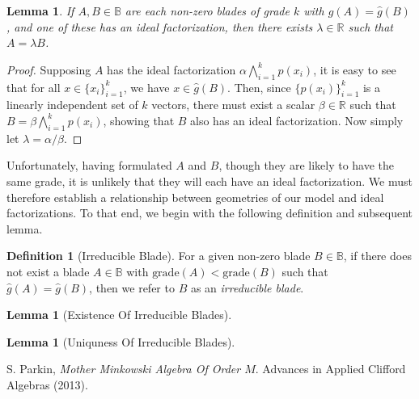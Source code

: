 \documentclass{birkjour}
\newtheorem{lem}[thm]{Lemma}
\theoremstyle{definition}
\newtheorem{defn}[thm]{Definition}
\theoremstyle{remark}
\numberwithin{equation}{section}
\newcommand{\R}{\mathbb{R}}
\newcommand{\B}{\mathbb{B}}
\newcommand{\gh}{\hat{g}}
\newcommand{\grade}{\mbox{grade}}
\begin{document}
\begin{lem}
If $A,B\in\B$ are each non-zero blades of grade $k$ with $\gh(A)=\gh(B)$, and one of these
has an ideal factorization, then there exists $\lambda\in\R$ such that $A=\lambda B$.
\end{lem}
\begin{proof}
Supposing $A$ has the ideal factorization $\alpha\bigwedge_{i=1}^k p(x_i)$,
it is easy to see that for all $x\in\{x_i\}_{i=1}^k$, we have $x\in\gh(B)$.
Then, since $\{p(x_i)\}_{i=1}^k$ is a linearly independent set of $k$ vectors,
there must exist a scalar $\beta\in\R$ such that $B=\beta\bigwedge_{i=1}^k p(x_i)$,
showing that $B$ also has an ideal factorization.  Now simply let $\lambda=\alpha/\beta$.
\end{proof}

Unfortunately, having formulated $A$ and $B$, though they are likely to have the same grade,
it is unlikely that they will each have an ideal factorization.  We must therefore establish a relationship
between geometries of our model and ideal factorizations.  To that end, we begin with the following
definition and subsequent lemma.

\begin{defn}[Irreducible Blade]
For a given non-zero blade $B\in\B$, if there does not exist a blade $A\in\B$
with $\grade(A)<\grade(B)$ such that $\gh(A)=\gh(B)$, then we refer
to $B$ as an {\it irreducible blade}.
\end{defn}

\begin{lem}[Existence Of Irreducible Blades]
\end{lem}

\begin{lem}[Uniquness Of Irreducible Blades]
\end{lem}



\begin{thebibliography}{9}

S. Parkin, {\it Mother Minkowski Algebra Of Order $M$}.
Advances in Applied Clifford Algebras (2013).

\end{thebibliography}
\end{document}
